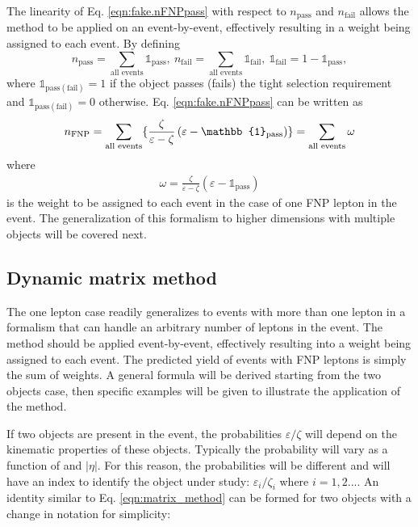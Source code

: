The linearity of Eq. \ref{eqn:fake.nFNPpass}  with respect to $n_\text{pass}$ 
and $n_\text{fail}$ allows the method to be applied on an event-by-event, 
effectively resulting in a weight being assigned to each event. 
By defining
\[
  n_\text{pass} = \sum_\text{all events} \mathbb{1}_\text{pass},~
  n_\text{fail} = \sum_\text{all events} \mathbb{1}_\text{fail},~ 
  \mathbb{1}_\text{fail} = 1 -  \mathbb{1}_\text{pass},
\]
where $\mathbb{1}_{\text{pass} \left(\text{fail}\right)} = 1$ if the object passes 
(fails) the tight selection requirement and $\mathbb{1}_{\text{pass}\left(\text{fail}\right)} = 0$ otherwise. Eq. \ref{eqn:fake.nFNPpass} can be written as
\[
n_\text{FNP} = \sum_\text{all events} \{
\frac{\zeta}{\varepsilon - \zeta}\left(\varepsilon - 
\mathbb{1}_\text{pass}\right)
\}
\\
=  \sum_\text{all events} \omega
\]
where 
\begin{align}
  \omega = \frac{\zeta}{\varepsilon - \zeta}\left(\varepsilon - 
\mathbb{1}_\text{pass}\right)
  \label{eqn:fake.nFNPpass.demo}
\end{align}
is the weight to be assigned to each event in the case of one FNP lepton 
in the event. 
The generalization of this formalism to higher dimensions 
with multiple objects will be covered next.



\subsection{Dynamic matrix method}


The one lepton case readily generalizes to events with more than one lepton
in a formalism that can handle an arbitrary number of leptons 
in the event. The method should be applied event-by-event, effectively 
resulting into a weight being assigned to each event. The predicted yield of 
events with FNP leptons is simply the sum of weights.
A general formula will be derived starting from the two objects case, 
then specific examples will be given to illustrate the application of the 
method.

If two objects are present in the event, the probabilities $\varepsilon/\zeta$
will depend on the kinematic properties of these objects. Typically 
the probability will vary as a function of \pt and $|\eta|$. For this reason,
the probabilities will be different and will have an index to 
identify the object under study: 
 $\varepsilon_i/\zeta_i$ where $i=1,2...$. 
An identity similar to Eq.  \ref{eqn:matrix_method} can be formed for 
two objects with a change in notation for simplicity:

